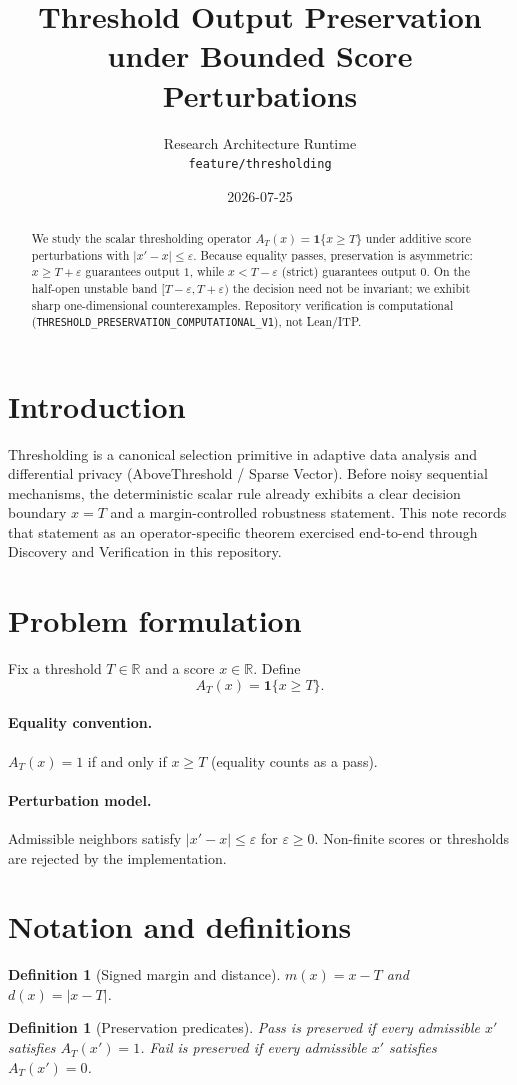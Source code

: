 \documentclass[11pt]{article}
\title{Threshold Output Preservation under Bounded Score Perturbations}
\author{Research Architecture Runtime \\ \texttt{feature/thresholding}}
\date{2026-07-25}
\newtheorem{definition}[theorem]{Definition}
\begin{document}
\maketitle

\begin{abstract}
We study the scalar thresholding operator
\(A_T(x)=\mathbf{1}\{x\ge T\}\) under additive score perturbations
with \(\lvert x'-x\rvert\le\varepsilon\).
Because equality passes, preservation is asymmetric:
\(x\ge T+\varepsilon\) guarantees output \(1\), while
\(x<T-\varepsilon\) (strict) guarantees output \(0\).
On the half-open unstable band \([T-\varepsilon,T+\varepsilon)\) the
decision need not be invariant; we exhibit sharp one-dimensional
counterexamples.
Repository verification is computational
(\texttt{THRESHOLD\_PRESERVATION\_COMPUTATIONAL\_V1}), not Lean/ITP.
\end{abstract}

\section{Introduction}
Thresholding is a canonical selection primitive in adaptive data analysis
and differential privacy (AboveThreshold / Sparse Vector).
Before noisy sequential mechanisms, the deterministic scalar rule already
exhibits a clear decision boundary \(x=T\) and a margin-controlled
robustness statement.
This note records that statement as an operator-specific theorem exercised
end-to-end through Discovery and Verification in this repository.

\section{Problem formulation}
Fix a threshold \(T\in\mathbb{R}\) and a score \(x\in\mathbb{R}\).
Define
\[
A_T(x)=\mathbf{1}\{x\ge T\}.
\]
\paragraph{Equality convention.}
\(A_T(x)=1\) if and only if \(x\ge T\) (equality counts as a pass).
\paragraph{Perturbation model.}
Admissible neighbors satisfy \(\lvert x'-x\rvert\le\varepsilon\) for
\(\varepsilon\ge 0\).
Non-finite scores or thresholds are rejected by the implementation.

\section{Notation and definitions}
\begin{definition}[Signed margin and distance]
\(m(x)=x-T\) and \(d(x)=\lvert x-T\rvert\).
\end{definition}
\begin{definition}[Preservation predicates]
Pass is preserved if every admissible \(x'\) satisfies \(A_T(x')=1\).
Fail is preserved if every admissible \(x'\) satisfies \(A_T(x')=0\).
\end{definition}
\end{document}
